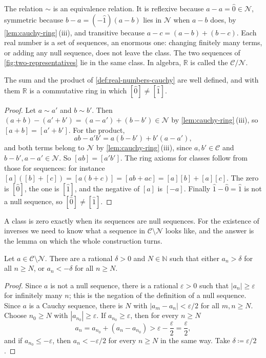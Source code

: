 The relation $\sim$ is an equivalence relation. It is reflexive because $a-a=\hat0\in\mathcal N$, symmetric because $b-a=(-\hat1)(a-b)$ lies in $\mathcal N$ when $a-b$ does, by \cref{lem:cauchy-ring}\,(iii), and transitive because $a-c=(a-b)+(b-c)$. Each real number is a set of sequences, an enormous one: changing finitely many terms, or adding any null sequence, does not leave the class. The two sequences of \cref{fig:two-representatives} lie in the same class. In algebra, $\mathbb R$ is called the  $\mathcal C/\mathcal N$.

\begin{proposition}
\label{prop:r-ring}
The sum and the product of \cref{def:real-numbers-cauchy} are well defined, and with them $\mathbb R$ is a commutative ring in which $[\hat0]\ne[\hat1]$.
\end{proposition}

\begin{proof}
Let $a\sim a'$ and $b\sim b'$. Then $(a+b)-(a'+b')=(a-a')+(b-b')\in\mathcal N$ by \cref{lem:cauchy-ring}\,(iii), so $[a+b]=[a'+b']$. For the product,
\[
ab-a'b'=a(b-b')+b'(a-a'),
\]
and both terms belong to $\mathcal N$ by \cref{lem:cauchy-ring}\,(iii), since $a,b'\in\mathcal C$ and $b-b',a-a'\in\mathcal N$. So $[ab]=[a'b']$. The ring axioms for classes follow from those for sequences: for instance $[a]([b]+[c])=[a(b+c)]=[ab+ac]=[a][b]+[a][c]$. The zero is $[\hat0]$, the one is $[\hat1]$, and the negative of $[a]$ is $[-a]$. Finally $\hat1-\hat0=\hat1$ is not a null sequence, so $[\hat0]\ne[\hat1]$.
\end{proof}

A class is zero exactly when its sequences are null sequences. For the existence of inverses we need to know what a sequence in $\mathcal C\setminus\mathcal N$ looks like, and the answer is the lemma on which the whole construction turns.

\begin{lemma}
\label{lem:away-from-zero}
Let $a\in\mathcal C\setminus\mathcal N$. There are a rational $\delta>0$ and $N\in\mathbb N$ such that either $a_n>\delta$ for all $n\ge N$, or $a_n<-\delta$ for all $n\ge N$.
\end{lemma}

\begin{proof}
Since $a$ is not a null sequence, there is a rational $\varepsilon>0$ such that $|a_n|\ge\varepsilon$ for infinitely many $n$; this is the negation of the definition of a null sequence. Since $a$ is a Cauchy sequence, there is $N$ with $|a_m-a_n|<\varepsilon/2$ for all $m,n\ge N$. Choose $n_0\ge N$ with $|a_{n_0}|\ge\varepsilon$. If $a_{n_0}\ge\varepsilon$, then for every $n\ge N$
\[
a_n=a_{n_0}+(a_n-a_{n_0})>\varepsilon-\frac\varepsilon2=\frac\varepsilon2 ,
\]
and if $a_{n_0}\le-\varepsilon$, then $a_n<-\varepsilon/2$ for every $n\ge N$ in the same way. Take $\delta\coloneqq\varepsilon/2$.
\end{proof}

